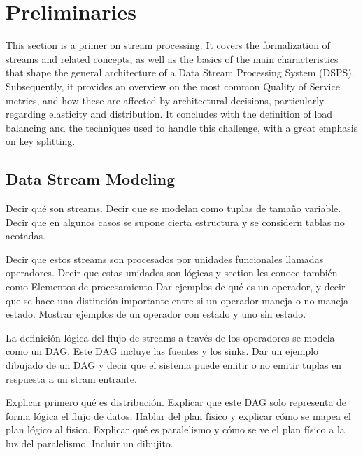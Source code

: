 \chapter{Preliminaries
  \label{chapter:preliminaries}}

  This section is a primer on stream processing. It covers the formalization of streams and related concepts, as well as the basics of the main characteristics that shape the general architecture of a Data Stream Processing System (DSPS). Subsequently, it provides an overview on the most common Quality of Service metrics, and how these are affected by architectural decisions, particularly regarding elasticity and distribution. It concludes with the definition of load balancing and the techniques used to handle this challenge, with a great emphasis on key splitting.

  \section{Data Stream Modeling}

  Decir qué son streams. Decir que se modelan como tuplas de tamaño variable. \cite{kamburugamuve2013survey} Decir que en algunos casos se supone cierta estructura y se considern tablas no acotadas.\cite{KottoKombi2015ParallelAD}

  Decir que estos streams son procesados por unidades funcionales llamadas operadores. Decir que estas unidades son lógicas y section les conoce también como Elementos de procesamiento \cite{kamburugamuve2013survey} Dar ejemplos de qué es un operador, y decir que se hace una distinción importante entre si un operador maneja o no maneja estado. Mostrar ejemplos de un operador con estado y uno sin estado.
  \cite{KottoKombi2015ParallelAD}

  La definición lógica del flujo de streams a través de los operadores se modela como un DAG. Este DAG incluye las fuentes y los sinks. Dar un ejemplo dibujado de un DAG y decir que el sistema puede emitir o no emitir tuplas en respuesta a un stram entrante.

  Explicar primero qué es distribución. Explicar que este DAG solo representa de forma lógica el flujo de datos. Hablar del plan físico y explicar cómo se mapea el plan lógico al físico. Explicar qué es paralelismo y cómo se ve el plan físico a la luz del paralelismo. Incluir un dibujito.
  \cite{kamburugamuve2013survey}

